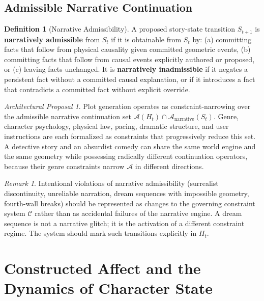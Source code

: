 \documentclass[11pt,a4paper]{article}
\theoremstyle{plain}
\theoremstyle{definition}
\newtheorem{definition}[theorem]{Definition}
\theoremstyle{remark}
\newtheorem{remark}[theorem]{Remark}
\newtheorem{proposal}[theorem]{Architectural Proposal}
\begin{document}
\subsection{Admissible Narrative Continuation}

\begin{definition}[Narrative Admissibility]
A proposed story-state transition $S_{t+1}$ is \textbf{narratively admissible} from $S_t$ if it is obtainable from $S_t$ by: (a) committing facts that follow from physical causality given committed geometric events, (b) committing facts that follow from causal events explicitly authored or proposed, or (c) leaving facts unchanged. It is \textbf{narratively inadmissible} if it negates a persistent fact without a committed causal explanation, or if it introduces a fact that contradicts a committed fact without explicit override.
\end{definition}

\begin{proposal}
Plot generation operates as constraint-narrowing over the admissible narrative continuation set $\mathcal{A}(H_t) \cap \mathcal{A}_{\mathrm{narrative}}(S_t)$. Genre, character psychology, physical law, pacing, dramatic structure, and user instructions are each formalized as constraints that progressively reduce this set. A detective story and an absurdist comedy can share the same world engine and the same geometry while possessing radically different continuation operators, because their genre constraints narrow $\mathcal{A}$ in different directions.
\end{proposal}

\begin{remark}
Intentional violations of narrative admissibility (surrealist discontinuity, unreliable narration, dream sequences with impossible geometry, fourth-wall breaks) should be represented as changes to the governing constraint system $\mathcal{C}$ rather than as accidental failures of the narrative engine. A dream sequence is not a narrative glitch; it is the activation of a different constraint regime. The system should mark such transitions explicitly in $H_t$.
\end{remark}

\section{Constructed Affect and the Dynamics of Character State}
\label{sec:affect}
\end{document}
